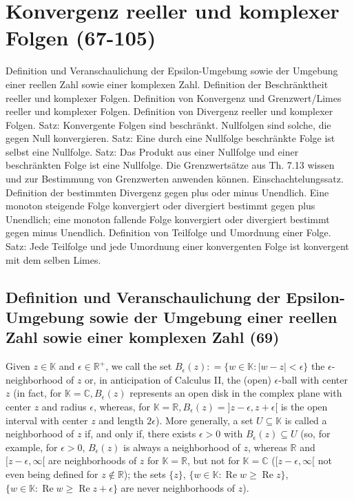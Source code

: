 \section{Konvergenz reeller und komplexer Folgen (67-105)}
 
Definition und Veranschaulichung der Epsilon-Umgebung sowie der Umgebung einer reellen Zahl sowie einer komplexen Zahl. Definition der Beschränktheit reeller und komplexer Folgen. Definition von Konvergenz und Grenzwert/Limes reeller und komplexer Folgen. Definition von Divergenz reeller und komplexer Folgen. Satz: Konvergente Folgen sind beschränkt. Nullfolgen sind solche, die gegen Null konvergieren. Satz: Eine durch eine Nullfolge beschränkte Folge ist selbst eine Nullfolge. Satz: Das Produkt aus einer Nullfolge und einer beschränkten Folge ist eine Nullfolge. Die Grenzwertsätze aus Th. 7.13 wissen und zur Bestimmung von Grenzwerten anwenden können. Einschachtelungssatz. Definition der bestimmten Divergenz gegen plus oder minus Unendlich. Eine monoton steigende Folge konvergiert oder divergiert bestimmt gegen plus Unendlich; eine monoton fallende Folge konvergiert oder divergiert bestimmt gegen minus Unendlich. Definition von Teilfolge und Umordnung einer Folge. Satz: Jede Teilfolge und jede Umordnung einer konvergenten Folge ist konvergent mit dem selben Limes. 


\subsection{Definition und Veranschaulichung der Epsilon-Umgebung sowie der Umgebung einer reellen Zahl sowie einer komplexen Zahl (69)}

Given $z \in \mathbb { K }$ and $\epsilon \in \mathbb { R } ^ { + }$, we call the set $B _ { \epsilon } ( z ) : = \{ w \in \mathbb { K } : | w - z | < \epsilon \}$ the $\epsilon$-neighborhood of $z$ or, in anticipation of Calculus II, the (open) $\epsilon$-ball
with center $z$ (in fact, for $\mathbb { K } = \mathbb { C } ,B _ { \epsilon } ( z )$ represents an open disk in the complex
plane with center $z$ and radius $\epsilon$, whereas, for $\mathbb { K } = \mathbb { R } ,B _ { \epsilon } ( z ) = ] z - \epsilon ,z + \epsilon [$ is the
open interval with center $z$ and length $2\epsilon$). More generally, a set $U \subseteq \mathbb { K }$ is called
a neighborhood of $z$ if, and only if, there exists $\epsilon > 0$ with $B _ { \epsilon } ( z ) \subseteq U$ (so, for
example, for $\epsilon > 0$, $B _ { \epsilon } ( z )$ is always a neighborhood of $z$, whereas $\mathbb { R }$ and $[ z - \epsilon ,\infty [$
are neighborhoods of $z$ for $\mathbb { K } = \mathbb { R }$, but not for $\mathbb { K } = \mathbb { C }$ ($[ z - \epsilon ,\infty [$ not even being
defined for $z \notin \mathbb { R }$); the sets $\{z\}$, $\{ w \in \mathbb { K } : \operatorname{Re} w \geq \operatorname{Re} z \}$, $\{ w \in \mathbb { K } : \operatorname{Re} w \geq \operatorname{Re} z + \epsilon \}$ are never neighborhoods of $z$). \newline

